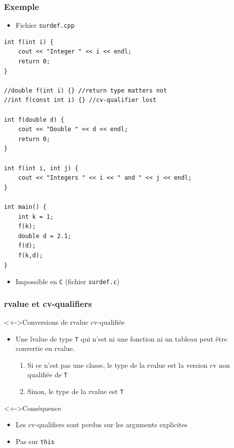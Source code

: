 \begin{frame}[containsverbatim]
\frametitle{Exemple}
\begin{itemize}
\item Fichier \texttt{surdef.cpp}
\end{itemize}
\begin{lstlisting}
int f(int i) {
	cout << "Integer " << i << endl; 
	return 0;
}

//double f(int i) {} //return type matters not
//int f(const int i) {} //cv-qualifier lost

int f(double d) {
	cout << "Double " << d << endl;
	return 0;
}

int f(int i, int j) {
	cout << "Integers " << i << " and " << j << endl;
}

int main() {
	int k = 1;
	f(k);
	double d = 2.1;
	f(d);
	f(k,d);
}
\end{lstlisting}
\begin{itemize}
\item Impossible en \texttt{C} (fichier \texttt{surdef.c})
\end{itemize}
\end{frame}

\begin{frame}
\frametitle{rvalue et cv-qualifiers}
\begin{exampleblock}<+->{Conversions de rvalue cv-qualifiée}
	\begin{itemize}[<+->]
	\item Une lvalue de type \texttt{T} qui n'est ni une fonction ni un tableau peut être convertie en rvalue.
		\begin{enumerate}
		\item Si ce n'est pas une classe, le type de la rvalue est la version cv non qualifiée de \texttt{T}
		\item Sinon, le type de la rvalue est \texttt{T}
		\end{enumerate}
	\end{itemize}
\end{exampleblock}
\begin{alertblock}<+->{Conséquence}
	\begin{itemize}[<+->]
	\item Les cv-qualifiers sont perdus sur les arguments explicites
	\item Pas sur \lstinline|this|
	\end{itemize}
\end{alertblock}
\end{frame}

